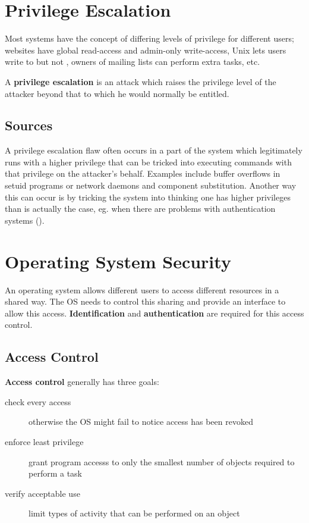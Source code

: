 \documentclass[12pt]{article}
\begin{document}
\section{Privilege Escalation}
Most systems have the concept of differing levels of privilege for different users; websites have global read-access and admin-only write-access, Unix lets users write to \code{\ttilde} but not , owners of mailing lists can perform extra tasks, etc.

A {\bf privilege escalation} is an attack which raises the privilege level of the attacker beyond that to which he would normally be entitled.

\subsection{Sources}
A privilege escalation flaw often occurs in a part of the system which legitimately runs with a higher privilege that can be tricked into executing commands with that privilege on the attacker's behalf. Examples include buffer overflows in setuid programs or network daemons and component substitution. Another way this can occur is by tricking the system into thinking one has higher privileges than is actually the case, eg. when there are problems with authentication systems ().

\section{Operating System Security}
An operating system allows different users to access different resources in a shared way. The OS needs to control this sharing and provide an interface to allow this access. {\bf Identification} and {\bf authentication} are required for this access control.


\subsection{Access Control}
{\bf Access control} generally has three goals:
\begin{description}
\item [check every access] otherwise the OS might fail to notice access has been revoked
\item [enforce least privilege] grant program accesss to only the smallest number of objects required to perform a task
\item [verify acceptable use] limit types of activity that can be performed on an object
\end{description}
\end{document}
